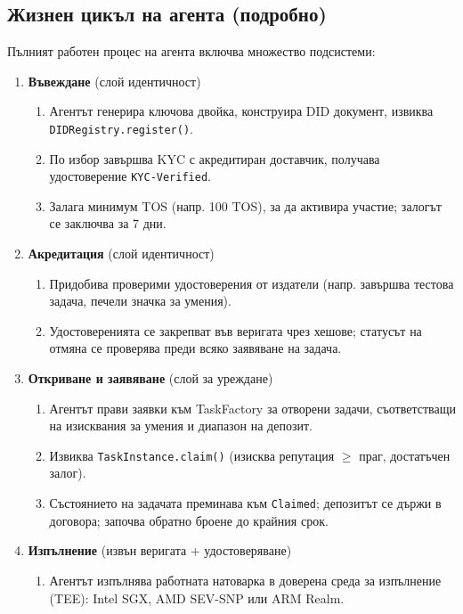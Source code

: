 \documentclass[11pt]{article}
\begin{document}
\subsection{Жизнен цикъл на агента (подробно)}
Пълният работен процес на агента включва множество подсистеми:

\begin{enumerate}
  \item \textbf{Въвеждане} (слой идентичност)
    \begin{enumerate}[label=\alph*.]
      \item Агентът генерира ключова двойка, конструира DID документ, извиква \texttt{DIDRegistry.register()}.
      \item По избор завършва KYC с акредитиран доставчик, получава удостоверение \texttt{KYC-Verified}.
      \item Залага минимум TOS (напр. 100 TOS), за да активира участие; залогът се заключва за 7 дни.
    \end{enumerate}
  \item \textbf{Акредитация} (слой идентичност)
    \begin{enumerate}[label=\alph*.]
      \item Придобива проверими удостоверения от издатели (напр. завършва тестова задача, печели значка за умения).
      \item Удостоверенията се закрепват във веригата чрез хешове; статусът на отмяна се проверява преди всяко заявяване на задача.
    \end{enumerate}
  \item \textbf{Откриване и заявяване} (слой за уреждане)
    \begin{enumerate}[label=\alph*.]
      \item Агентът прави заявки към TaskFactory за отворени задачи, съответстващи на изисквания за умения и диапазон на депозит.
      \item Извиква \texttt{TaskInstance.claim()} (изисква репутация $\geq$ праг, достатъчен залог).
      \item Състоянието на задачата преминава към \texttt{Claimed}; депозитът се държи в договора; започва обратно броене до крайния срок.
    \end{enumerate}
  \item \textbf{Изпълнение} (извън веригата + удостоверяване)
    \begin{enumerate}[label=\alph*.]
      \item Агентът изпълнява работната натоварка в доверена среда за изпълнение (TEE): Intel SGX, AMD SEV-SNP или ARM Realm.

\end{enumerate}
\end{enumerate}
\end{document}

